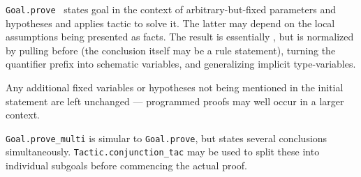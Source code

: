 \begin{isabellebody}
\begin{isamarkuptext}
  \begin{description}

  \item \verb|Goal.prove|~ states goal  in the context of arbitrary-but-fixed parameters 
  and hypotheses  and applies tactic  to
  solve it.  The latter may depend on the local assumptions being
  presented as facts.  The result is essentially , but is normalized by pulling \isa{{\isasymAnd}} before \isa{{\isasymLongrightarrow}}
  (the conclusion  itself may be a rule statement), turning
  the quantifier prefix into schematic variables, and generalizing
  implicit type-variables.

  Any additional fixed variables or hypotheses not being mentioned in
  the initial statement are left unchanged --- programmed proofs may
  well occur in a larger context.

  \item \verb|Goal.prove_multi| is simular to \verb|Goal.prove|, but
  states several conclusions simultaneously.  \verb|Tactic.conjunction_tac| may be used to split these into individual
  subgoals before commencing the actual proof.

  \end{description}%
\end{isamarkuptext}%
\isamarkuptrue%
%
\endisatagmlref
{\isafoldmlref}%
%
\isadelimmlref
%
\endisadelimmlref
%
\isadelimtheory
%
\endisadelimtheory
%
\isatagtheory
{}\isamarkupfalse%
%
\endisatagtheory
{\isafoldtheory}%
%
\isadelimtheory
%
\endisadelimtheory
\isanewline
\isanewline
\end{isabellebody}%

